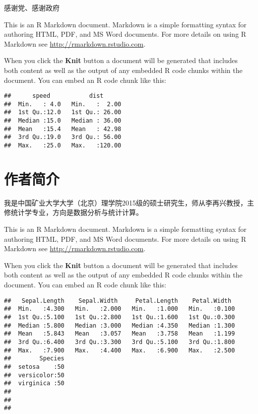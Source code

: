 \documentclass[]{ctexbook}
\theoremstyle{definition}
\theoremstyle{definition}
\theoremstyle{definition}
\theoremstyle{remark}
\begin{document}
感谢党、感谢政府

This is an R Markdown document. Markdown is a simple formatting syntax
for authoring HTML, PDF, and MS Word documents. For more details on
using R Markdown see \url{http://rmarkdown.rstudio.com}.

When you click the \textbf{Knit} button a document will be generated
that includes both content as well as the output of any embedded R code
chunks within the document. You can embed an R code chunk like this:

\begin{verbatim}
##      speed           dist       
##  Min.   : 4.0   Min.   :  2.00  
##  1st Qu.:12.0   1st Qu.: 26.00  
##  Median :15.0   Median : 36.00  
##  Mean   :15.4   Mean   : 42.98  
##  3rd Qu.:19.0   3rd Qu.: 56.00  
##  Max.   :25.0   Max.   :120.00
\end{verbatim}

\chapter*{作者简介}\label{author}

我是中国矿业大学大学（北京）理学院2015级的硕士研究生，师从李再兴教授，主修统计学专业，方向是数据分析与统计计算。

This is an R Markdown document. Markdown is a simple formatting syntax
for authoring HTML, PDF, and MS Word documents. For more details on
using R Markdown see \url{http://rmarkdown.rstudio.com}.

When you click the \textbf{Knit} button a document will be generated
that includes both content as well as the output of any embedded R code
chunks within the document. You can embed an R code chunk like this:

\begin{verbatim}
##   Sepal.Length    Sepal.Width     Petal.Length    Petal.Width   
##  Min.   :4.300   Min.   :2.000   Min.   :1.000   Min.   :0.100  
##  1st Qu.:5.100   1st Qu.:2.800   1st Qu.:1.600   1st Qu.:0.300  
##  Median :5.800   Median :3.000   Median :4.350   Median :1.300  
##  Mean   :5.843   Mean   :3.057   Mean   :3.758   Mean   :1.199  
##  3rd Qu.:6.400   3rd Qu.:3.300   3rd Qu.:5.100   3rd Qu.:1.800  
##  Max.   :7.900   Max.   :4.400   Max.   :6.900   Max.   :2.500  
##        Species  
##  setosa    :50  
##  versicolor:50  
##  virginica :50  
##                 
##                 
## 
\end{verbatim}
\end{document}
